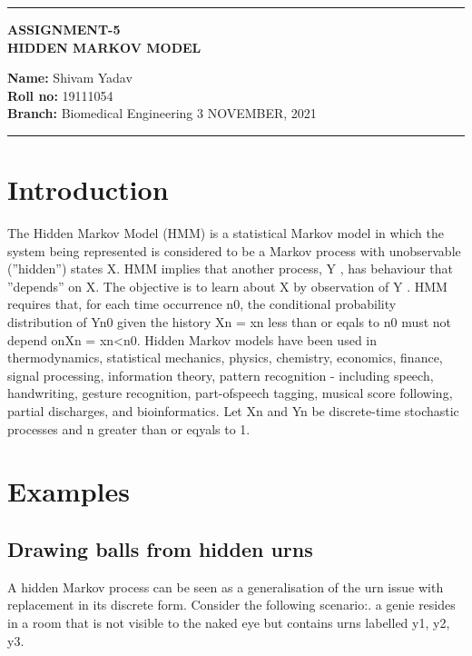 \documentclass[10pt,a4paper,twoside]{article}
\begin{document}
\begin{center}
\hrule

\vspace{.4cm}
{\bf {\Large ASSIGNMENT-5 }}\\
\vspace{.3cm}
{\bf {\huge  HIDDEN MARKOV MODEL  }}
\vspace{.3cm}
\end{center}
{\bf Name:}  Shivam Yadav\\
{\bf Roll no:}  19111054 \\
{\bf Branch: }  Biomedical Engineering \hspace{\fill}  3 NOVEMBER, 2021 \\
\hrule

\vspace{.5cm}






\section{Introduction}

The Hidden Markov Model (HMM) is a statistical Markov model in which the system being
represented is considered to be a Markov process with unobservable (”hidden”) states X.
HMM implies that another process, Y , has behaviour that ”depends” on X. The objective
is to learn about X by observation of Y . HMM requires that, for each time occurrence
n0, the conditional probability distribution of Yn0 given the history Xn = xn less than or eqals to n0 must
not depend onXn = xn<n0. Hidden Markov models have been used in thermodynamics,
statistical mechanics, physics, chemistry, economics, finance, signal processing, information
theory, pattern recognition - including speech, handwriting, gesture recognition, part-ofspeech tagging, musical score following, partial discharges, and bioinformatics. Let Xn and
Yn be discrete-time stochastic processes and n greater than or eqyals to 1.

\section{ Examples}
\subsection{Drawing balls from hidden urns}
A hidden Markov process can be seen as a generalisation of the urn issue with replacement in its discrete form. Consider the following scenario:. a genie resides in a room that is not visible to the naked eye but contains urns labelled y1, y2, y3.
\end{document}
